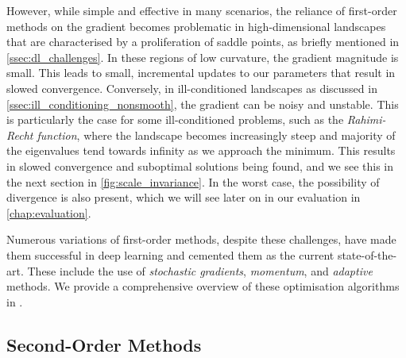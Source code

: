 However, while simple and effective in many scenarios, the reliance of first-order methods on the gradient becomes problematic in high-dimensional landscapes that are characterised by a proliferation of saddle points, as briefly mentioned in \cref{ssec:dl_challenges}. In these regions of low curvature, the gradient magnitude is small. This leads to small, incremental updates to our parameters that result in slowed convergence. Conversely, in ill-conditioned landscapes as discussed in \cref{ssec:ill_conditioning_nonsmooth}, the gradient can be noisy and unstable. 
This is particularly the case for some ill-conditioned problems, such as the \textit{Rahimi-Recht function}, where the landscape becomes increasingly steep and majority of the eigenvalues tend towards infinity as we approach the minimum. This results in slowed convergence and suboptimal solutions being found, and we see this in the next section in \cref{fig:scale_invariance}. In the worst case, the possibility of divergence is also present, which we will see later on in our evaluation in \cref{chap:evaluation}. 

Numerous variations of first-order methods, despite these challenges, have made them successful in deep learning and cemented them as the current state-of-the-art. These include the use of \textit{stochastic gradients}, \textit{momentum}, and \textit{adaptive} methods. We provide a comprehensive overview of these optimisation algorithms in .

\subsection{Second-Order Methods}
\label{ssec:second_order_methods}


